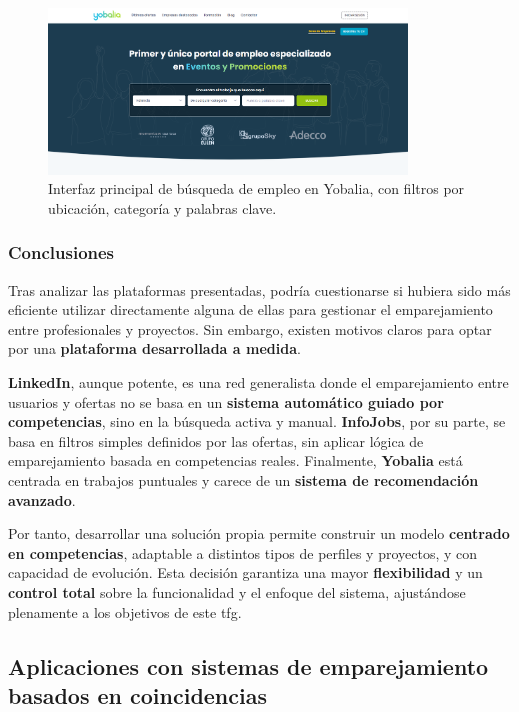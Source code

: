 \begin{figure}[H]
    \centering
    \includegraphics[width=0.85\textwidth]{figs/yobalia-portada.png}
    \caption{Interfaz principal de búsqueda de empleo en Yobalia, con filtros por ubicación, categoría y palabras clave.}
    \label{fig:yobalia-portada}
\end{figure}

\subsubsection{Conclusiones}

Tras analizar las plataformas presentadas, podría cuestionarse si hubiera sido más
eficiente utilizar directamente alguna de ellas para gestionar el emparejamiento entre
profesionales y proyectos. Sin embargo, existen motivos claros para optar por una
\textbf{plataforma desarrollada a medida}.

\textbf{LinkedIn}, aunque potente, es una red generalista donde el emparejamiento entre
usuarios y ofertas no se basa en un \textbf{sistema automático guiado por competencias},
sino en la búsqueda activa y manual. \textbf{InfoJobs}, por su parte, se basa en filtros
simples definidos por las ofertas, sin aplicar lógica de emparejamiento basada en
competencias reales. Finalmente, \textbf{Yobalia} está centrada en trabajos puntuales y
carece de un \textbf{sistema de recomendación avanzado}.

Por tanto, desarrollar una solución propia permite construir un modelo \textbf{centrado en
competencias}, adaptable a distintos tipos de perfiles y proyectos, y con capacidad de
evolución. Esta decisión garantiza una mayor \textbf{flexibilidad} y un \textbf{control
total} sobre la funcionalidad y el enfoque del sistema, ajustándose plenamente a los
objetivos de este \gls{tfg}.

\subsection{Aplicaciones con sistemas de emparejamiento basados en coincidencias}

